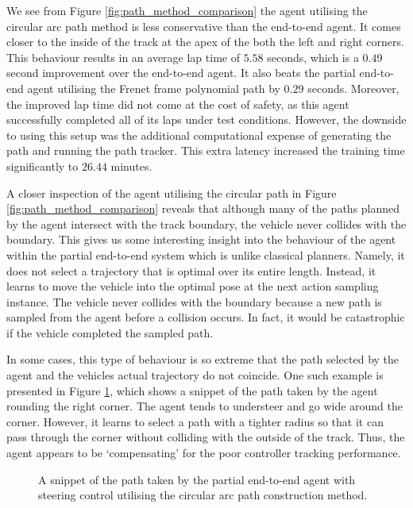 We see from Figure \ref{fig:path_method_comparison} the agent utilising the circular arc path method is less conservative than the end-to-end agent.
It comes closer to the inside of the track at the apex of the both the left and right corners.
This behaviour results in an average lap time of $5.58$ seconds, which is a $0.49$ second improvement over the end-to-end agent.
It also beats the partial end-to-end agent utilising the Frenet frame polynomial path by $0.29$ seconds.
Moreover, the improved lap time did not come at the cost of safety, as this agent successfully completed all of its laps under test conditions.
However, the downside to using this setup was the additional computational expense of generating the path and running the path tracker. 
This extra latency increased the training time significantly to $26.44$ minutes.


A closer inspection of the agent utilising the circular path in Figure \ref{fig:path_method_comparison} reveals that although many of the paths planned by the agent intersect with the track boundary, the vehicle never collides with the boundary.
This gives us some interesting insight into the behaviour of the agent within the partial end-to-end system which is unlike classical planners.
Namely, it does not select a trajectory that is optimal over its entire length.
Instead, it learns to move the vehicle into the optimal pose at the next action sampling instance.
The vehicle never collides with the boundary because a new path is sampled from the agent before a collision occurs.
In fact, it would be catastrophic if the vehicle completed the sampled path.

In some cases, this type of behaviour is so extreme that the path selected by the agent and the vehicles actual trajectory do not coincide.
One such example is presented in Figure \ref{fig:understeer_path}, which shows a snippet of the path taken by the agent rounding the right corner.
The agent tends to understeer and go wide around the corner.
However, it learns to select a path with a tighter radius so that it can pass through the corner without colliding with the outside of the track.
Thus, the agent appears to be `compensating' for the poor controller tracking performance.

\begin{figure}[htb!]
    \centering
    
    \caption[A snippet of the path taken by a partial end-to-end agent]{A snippet of the path taken by the partial end-to-end agent with steering control utilising the circular arc path construction method.}
    \label{fig:understeer_path}
\end{figure}


